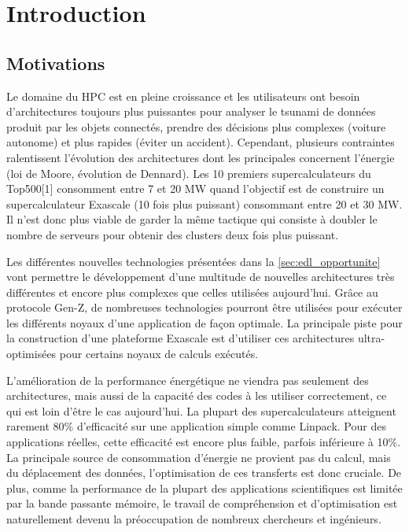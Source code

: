 \section{Introduction} \label{sec:dev_intro}

\subsection{Motivations}
    
    Le domaine du HPC est en pleine croissance et les utilisateurs ont besoin d'architectures toujours plus puissantes pour analyser le tsunami de données produit par les objets connectés, prendre des décisions plus complexes (voiture autonome) et plus rapides (éviter un accident). Cependant, plusieurs contraintes ralentissent l'évolution des architectures dont les principales concernent l'énergie (loi de Moore, évolution de Dennard). Les 10 premiers supercalculateurs du Top500[1] consomment entre 7 et 20 MW quand l'objectif est de construire un supercalculateur Exascale (10 fois plus puissant) consommant entre 20 et 30 MW. Il n'est donc plus viable de garder la même tactique qui consiste à doubler le nombre de serveurs pour obtenir des clusters deux fois plus puissant.
    
    Les différentes nouvelles technologies présentées dans la \autoref{sec:edl_opportunite} vont permettre le développement d'une multitude de nouvelles architectures très différentes et encore plus complexes que celles utilisées aujourd'hui. Grâce au protocole Gen-Z, de nombreuses technologies pourront être utilisées pour exécuter les différents noyaux d'une application de façon optimale. La principale piste pour la construction d'une plateforme Exascale est d'utiliser ces architectures ultra-optimisées pour certains noyaux de calculs exécutés.
    
    L'amélioration de la performance énergétique ne viendra pas seulement des architectures, mais aussi de la capacité des codes à les utiliser correctement, ce qui est loin d'être le cas aujourd'hui. La plupart des supercalculateurs atteignent rarement 80\% d'efficacité sur une application simple comme Linpack\cite{Dongarra2003}. Pour des applications réelles, cette efficacité est encore plus faible, parfois inférieure à 10\%\cite{Oliker2005}. La principale source de consommation d'énergie ne provient pas du calcul, mais du déplacement des données\cite{Kothe2016}, l'optimisation de ces transferts est donc cruciale. De plus, comme la performance de la plupart des applications scientifiques est limitée par la bande passante mémoire, le travail de compréhension et d'optimisation est naturellement devenu la préoccupation de nombreux chercheurs et ingénieurs\cite{McCalpin1995}.
    


